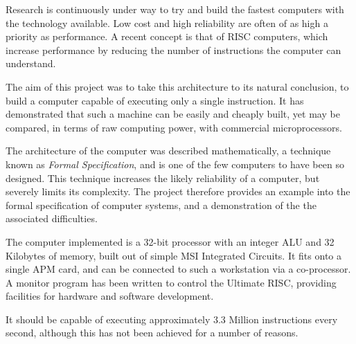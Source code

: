 
Research is continuously under way to try and build the fastest computers with the  technology available.
Low cost and high reliability are often of as high a priority as performance.
A recent concept is that of RISC computers, which  increase performance by reducing the number of instructions the computer can understand.

The aim of this  project was to take this architecture to its natural conclusion, to build a computer capable of executing only a single instruction.
It has demonstrated that such a machine can be easily and cheaply built, yet may
be compared, in terms of raw computing power, with commercial microprocessors.

The architecture of the computer was described mathematically,   a technique known as {\em Formal Specification}, and is one of the few computers to have been  so designed.
This technique  increases the likely reliability of a computer, but severely limits its complexity.
The project therefore provides an example into the formal specification of computer systems, and a demonstration of the the  associated difficulties.


The computer implemented is a 32-bit processor with an integer ALU and 32 Kilobytes of memory, built out of simple MSI Integrated Circuits.
It fits onto a single APM card, and can be connected to such a workstation via a co-processor.
A monitor program has been written to control the Ultimate RISC, providing facilities for hardware and software development.

It should be capable of executing approximately 3.3 Million instructions every second, although this has not been achieved for a number of reasons.


